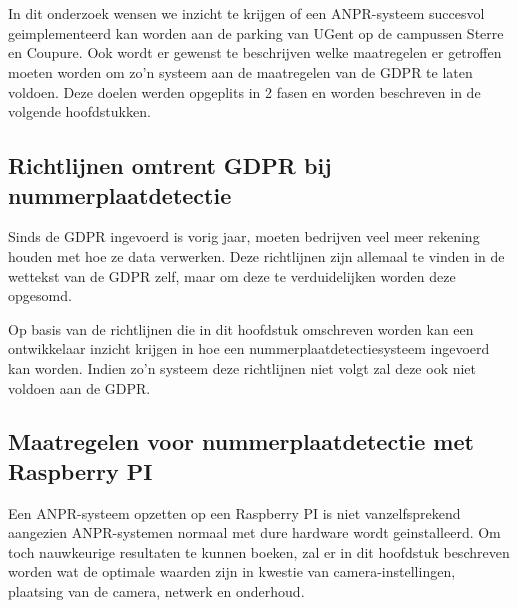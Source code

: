 
\chapter{}
\label{ch:methodologie}


In dit onderzoek wensen we inzicht te krijgen of een ANPR-systeem succesvol geimplementeerd kan worden aan de parking van UGent op de campussen Sterre en Coupure. Ook wordt er gewenst te beschrijven welke maatregelen er getroffen moeten worden om zo'n systeem aan de maatregelen van de GDPR te laten voldoen. Deze doelen werden opgeplits in 2 fasen en worden beschreven in de volgende hoofdstukken.

\section{Richtlijnen omtrent GDPR bij nummerplaatdetectie}
Sinds de GDPR ingevoerd is vorig jaar, moeten bedrijven veel meer rekening houden met hoe ze data verwerken. Deze richtlijnen zijn allemaal te vinden in de wettekst van de GDPR zelf, maar om deze te verduidelijken worden deze opgesomd.

Op basis van de richtlijnen die in dit hoofdstuk omschreven worden kan een ontwikkelaar inzicht krijgen in hoe een nummerplaatdetectiesysteem ingevoerd kan worden. Indien zo'n systeem deze richtlijnen niet volgt zal deze ook niet voldoen aan de GDPR. 

\section{Maatregelen voor nummerplaatdetectie met Raspberry PI}
Een ANPR-systeem opzetten op een Raspberry PI is niet vanzelfsprekend aangezien ANPR-systemen normaal met dure hardware wordt geinstalleerd. Om toch nauwkeurige resultaten te kunnen boeken, zal er in dit hoofdstuk beschreven worden wat de optimale waarden zijn in kwestie van camera-instellingen, plaatsing van de camera, netwerk en onderhoud.

